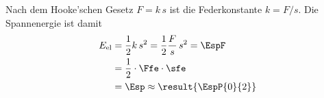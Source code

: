 Nach dem Hooke'schen Gesetz $F = k\,s$ ist die Federkonstante $k = F/s$. Die Spannenergie ist damit
\begin{align}
 E_\mathrm{el} &= \frac{1}{2}k\,s^2 = \frac{1}{2}\frac{F}{s}\,s^2 = \EspF \\
   &= \frac{1}{2}\cdot\Ffe\cdot\sfe \\
   &= \Esp \approx \result{\EspP{0}{2}}
\end{align}
